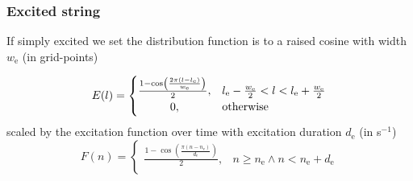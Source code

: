 \documentclass{article}
\begin{document}
\subsubsection{Excited string}
If simply excited we set the distribution function is to a raised cosine with width $w_\text{e}$ (in grid-points)

\begin{equation}\label{eq:discDist}
    E(l) = 
    \begin{cases}
        \hfil \frac{1 - \cos(\frac{2 \pi (l - l_\text{e})}{w_\text{e}})}{2}, & l_\text{e} -  \frac{w_\text{e}}{2} < l < l_\text{e} + \frac{w_\text{e}}{2} \\
        \hfil 0, &\text{otherwise}
    \end{cases}
\end{equation}
scaled by the excitation function over time with excitation duration $d_\text{e}$ (in s$^{-1}$)
\begin{equation}\label{eq:discExcitation}
    F(n) = 
    \begin{cases}
        \frac{1 - \cos(\frac{\pi (n - n_\text{e})}{d_\text{e}})}{2}, & n \geq n_\text{e} \wedge n < n_\text{e}+d_\text{e}\\
    \end{cases}
\end{equation}
\end{document}
